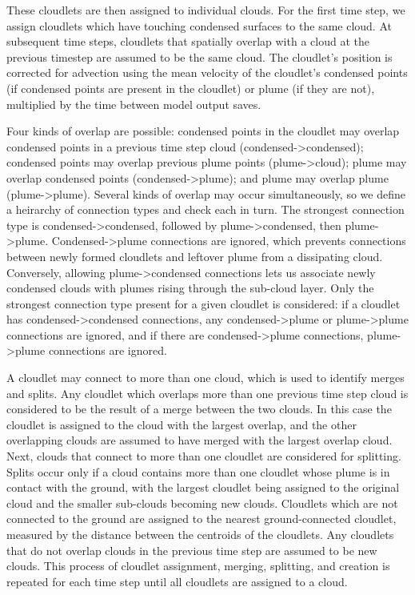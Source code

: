 \documentclass[acp]{copernicus}
\begin{document}
These cloudlets are then assigned to individual clouds.  For the first time 
step, we assign cloudlets which have touching condensed surfaces to the same 
cloud.  At subsequent time steps, cloudlets that spatially overlap with a cloud 
at the previous timestep are assumed to be the same cloud.  The cloudlet's 
position is corrected for advection using the mean velocity of the cloudlet's 
condensed points (if condensed points are present in the cloudlet) or plume 
(if they are not), multiplied by the time between model output saves.

Four kinds of overlap are possible: condensed points in the cloudlet may 
overlap condensed points in a previous time step cloud (condensed->condensed); 
condensed points may overlap previous plume points (plume->cloud); plume may 
overlap condensed points (condensed->plume); and plume may overlap plume 
(plume->plume).  Several kinds of overlap may occur simultaneously, so we 
define a heirarchy of connection types and check each in turn.  The strongest 
connection type is condensed->condensed, followed by plume->condensed, then 
plume->plume.  Condensed->plume connections are ignored, which prevents 
connections between newly formed cloudlets and leftover plume from a 
dissipating cloud.  Conversely, allowing plume->condensed connections lets us 
associate newly condensed clouds with plumes rising through the sub-cloud 
layer.  Only the strongest connection type present for a given cloudlet is 
considered: if a cloudlet has condensed->condensed connections, any 
condensed->plume or plume->plume connections are ignored, and if there are 
condensed->plume connections, plume->plume connections are ignored.  

A cloudlet may connect to more than one cloud, which is used to identify 
merges and splits.  Any cloudlet which overlaps more than one previous time 
step cloud is considered to be the result of a merge between the two clouds.  
In this case the cloudlet is assigned to the cloud with the largest overlap, 
and the other overlapping clouds are assumed to have merged with the largest 
overlap cloud.  Next, clouds that connect to more than one cloudlet are 
considered for splitting.  Splits occur only if a cloud contains more than one 
cloudlet whose plume is in contact with the ground, with the largest cloudlet 
being assigned to the original cloud and the smaller sub-clouds becoming new 
clouds.  Cloudlets which are not connected to the ground are assigned to the 
nearest ground-connected cloudlet, measured by the distance between the 
centroids of the cloudlets.  Any cloudlets that do not overlap clouds in the 
previous time step are assumed to be new clouds.  This process of cloudlet 
assignment, merging, splitting, and creation is repeated for each time step 
until all cloudlets are assigned to a cloud.
  
\end{document}
